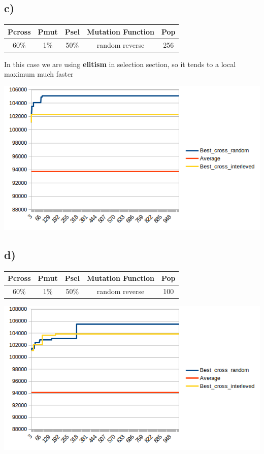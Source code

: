 \documentclass{article}
\begin{document}
\subsection*{c)}
\begin{table}[!htb]
\centering
\begin{tabular}{|c|c|c|c|c|}
\hline
\textbf{Pcross} & \textbf{Pmut} & \textbf{Psel} & \textbf{Mutation Function} & \textbf{Pop} \\ \hline
60\% & 1\% & 50\% & random reverse & 256 \\ \hline
\end{tabular}
\end{table}
In this case we are using \textbf{elitism} in selection section, so it tends to a local maximum much faster

\includegraphics[scale=0.75]{13}

\subsection*{d)}
\begin{table}[!htb]
\centering
\begin{tabular}{|c|c|c|c|c|}
\hline
\textbf{Pcross} & \textbf{Pmut} & \textbf{Psel} & \textbf{Mutation Function} & \textbf{Pop} \\ \hline
60\% & 1\% & 50\% & random reverse & 100 \\ \hline
\end{tabular}
\end{table}
\includegraphics[scale=0.75]{14}
\end{document}
